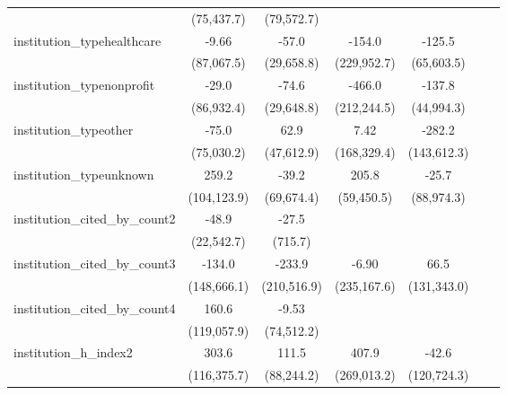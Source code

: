 \begin{tabular}{lcccccc}
                                      & (75,437.7)   & (79,572.7)    &             &             &     &   \\   
   institution\_typehealthcare        & -9.66        & -57.0         & -154.0      & -125.5      &     &   \\   
                                      & (87,067.5)   & (29,658.8)    & (229,952.7) & (65,603.5)  &     &   \\   
   institution\_typenonprofit         & -29.0        & -74.6         & -466.0      & -137.8      &     &   \\   
                                      & (86,932.4)   & (29,648.8)    & (212,244.5) & (44,994.3)  &     &   \\   
   institution\_typeother             & -75.0        & 62.9          & 7.42        & -282.2      &     &   \\   
                                      & (75,030.2)   & (47,612.9)    & (168,329.4) & (143,612.3) &     &   \\   
   institution\_typeunknown           & 259.2        & -39.2         & 205.8       & -25.7       &     &   \\   
                                      & (104,123.9)  & (69,674.4)    & (59,450.5)  & (88,974.3)  &     &   \\   
   institution\_cited\_by\_count2     & -48.9        & -27.5         &             &             &     &   \\   
                                      & (22,542.7)   & (715.7)       &             &             &     &   \\   
   institution\_cited\_by\_count3     & -134.0       & -233.9        & -6.90       & 66.5        &     &   \\   
                                      & (148,666.1)  & (210,516.9)   & (235,167.6) & (131,343.0) &     &   \\   
   institution\_cited\_by\_count4     & 160.6        & -9.53         &             &             &     &   \\   
                                      & (119,057.9)  & (74,512.2)    &             &             &     &   \\   
   institution\_h\_index2             & 303.6        & 111.5         & 407.9       & -42.6       &     &   \\   
                                      & (116,375.7)  & (88,244.2)    & (269,013.2) & (120,724.3) &     &   \\   

\end{tabular}
